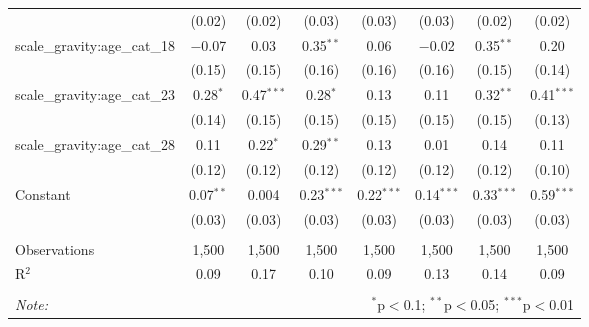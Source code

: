 \documentclass[
]{article}
\begin{document}
\begin{sidewaystable}[!htbp]
\begin{tabular}{@{\extracolsep{1pt}}lccccccc}
  & (0.02) & (0.02) & (0.03) & (0.03) & (0.03) & (0.02) & (0.02) \\ 
  scale\_gravity:age\_cat\_18 & $-$0.07 & 0.03 & 0.35$^{**}$ & 0.06 & $-$0.02 & 0.35$^{**}$ & 0.20 \\ 
  & (0.15) & (0.15) & (0.16) & (0.16) & (0.16) & (0.15) & (0.14) \\ 
  scale\_gravity:age\_cat\_23 & 0.28$^{*}$ & 0.47$^{***}$ & 0.28$^{*}$ & 0.13 & 0.11 & 0.32$^{**}$ & 0.41$^{***}$ \\ 
  & (0.14) & (0.15) & (0.15) & (0.15) & (0.15) & (0.15) & (0.13) \\ 
  scale\_gravity:age\_cat\_28 & 0.11 & 0.22$^{*}$ & 0.29$^{**}$ & 0.13 & 0.01 & 0.14 & 0.11 \\ 
  & (0.12) & (0.12) & (0.12) & (0.12) & (0.12) & (0.12) & (0.10) \\ 
  Constant & 0.07$^{**}$ & 0.004 & 0.23$^{***}$ & 0.22$^{***}$ & 0.14$^{***}$ & 0.33$^{***}$ & 0.59$^{***}$ \\ 
  & (0.03) & (0.03) & (0.03) & (0.03) & (0.03) & (0.03) & (0.03) \\ 
 \hline \\[-1.8ex] 
Observations & 1,500 & 1,500 & 1,500 & 1,500 & 1,500 & 1,500 & 1,500 \\ 
R$^{2}$ & 0.09 & 0.17 & 0.10 & 0.09 & 0.13 & 0.14 & 0.09 \\ 
\hline 
\hline \\[-1.8ex] 
\textit{Note:}  & \multicolumn{7}{r}{$^{*}$p$<$0.1; $^{**}$p$<$0.05; $^{***}$p$<$0.01} \\ 
\end{tabular} 
\end{sidewaystable}
\end{document}
